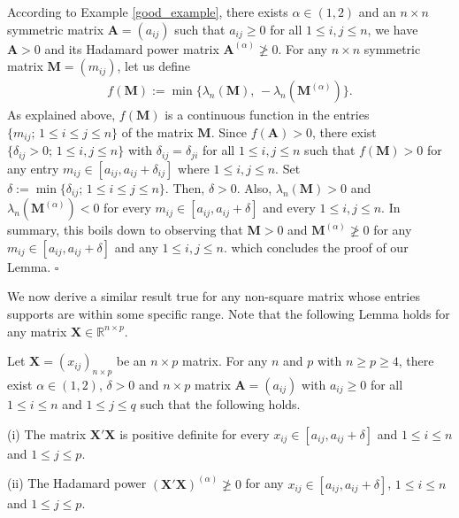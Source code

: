 \documentclass[conference,letterpaper]{IEEEtran}
\numberwithin{equation}{section}
\newcommand{\lbl}{\label}
\newcommand{\beaa}{\begin{eqnarray*}}
\newcommand{\eeaa}{\end{eqnarray*}}
\begin{document}
According to Example \ref{good_example}, there exists  $\alpha\in (1, 2)$ and an $n\times n$ symmetric matrix $\mathbf{A}=(a_{ij})$ such that $a_{ij}\geq 0$ for all $1\leq i, j \leq n$, we have $\mathbf{A}>0$ and its Hadamard power matrix $\mathbf{A}^{(\alpha)} \ngeqslant 0$. 
For any $n\times n$ symmetric matrix  $\mathbf{M}=(m_{ij})$, let us define
\beaa
f(\mathbf{M}):=\min\big\{\lambda_n(\mathbf{M}),\, -\lambda_n(\mathbf{M}^{(\alpha)})\big\}.
\eeaa
As explained above, $f(\mathbf{M})$ is a continuous function in the entries $\{m_{ij};\, 1\leq i\leq j \leq n\}$ of the matrix $\mathbf{M}$. 
Since $f(\mathbf{A})>0$, there exist $\{\delta_{ij}>0;\, 1\leq i, j\leq n\}$ with $\delta_{ij}=\delta_{ji}$ for all $1\leq i, j\leq n$ such that $f(\mathbf{M})>0$ for any entry $m_{ij}\in [a_{ij}, a_{ij}+\delta_{ij}]$ where $1\leq i, j\leq n$.
Set $\delta := \min\{\delta_{ij};\, 1\leq i\leq j\leq n\}.$ Then, $\delta>0$. Also, $\lambda_n(\mathbf{M})>0$ and $\lambda_n(\mathbf{M}^{(\alpha)})<0$ for every $m_{ij}\in [a_{ij}, a_{ij}+\delta]$ and every $1\leq i, j\leq n.$ 
In summary, this boils down to observing that $\mathbf{M}>0$  and $\mathbf{M}^{(\alpha)} \ngeqslant 0$ for any $m_{ij}\in [a_{ij}, a_{ij}+\delta]$ and any $1\leq i, j\leq n.$ which concludes the proof of our Lemma.
\hfill$\square$
\medskip


We now derive a similar result true for any non-square matrix whose entries supports are within some specific range.
Note that the following Lemma holds for any matrix $\mathbf{X} \in \mathbb{R}^{n \times p}$.
\begin{lem}\lbl{lemma:lem2} Let $\mathbf{X}=(x_{ij})_{n\times p}$ be an $n\times p$ matrix. For any $n$ and $p$ with $n\geq p\geq 4$, there exist $\alpha\in (1,2)$, $\delta>0$ and $n\times p$ matrix  $\mathbf{A}=(a_{ij})$ with $a_{ij}\geq 0$ for all $1\leq i\leq n$ and $1\leq  j \leq q$ such that the following holds.

(i)  The matrix $\mathbf{X}'\mathbf{X}$ is positive definite for every $x_{ij}\in [a_{ij}, a_{ij}+\delta]$ and $1\leq i\leq n$ and $1\leq j \leq p.$

(ii) The Hadamard power $(\mathbf{X}'\mathbf{X})^{(\alpha)}\ngeqslant 0$  for any $x_{ij}\in [a_{ij}, a_{ij}+\delta]$, $1\leq i\leq n$ and $1\leq j \leq p$.
\end{lem}
\medskip
\end{document}
